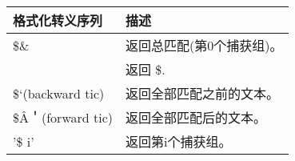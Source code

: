 \begin{longtable}[c]{|l|l|}
\hline
\textbf{格式化转义序列} & \textbf{描述}                        \\ \hline
\endfirsthead
%
\endhead
%
\$\&                            & 返回总匹配(第0个捕获组)。 \\ \hline
$$                              & 返回 \$.                                 \\ \hline
\$`(backward tic)               & 返回全部匹配之前的文本。    \\ \hline
\$\^{A}＇(forward tic) & 返回全部匹配后的文本。 \\ \hline
'\$ i'                          & 返回第i个捕获组。              \\ \hline
\end{longtable}























